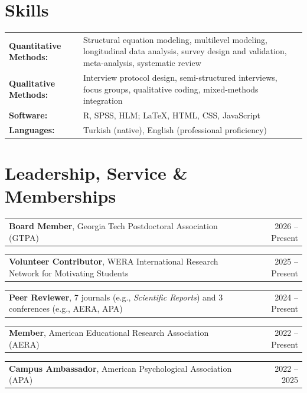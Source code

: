 \documentclass[letterpaper,11pt]{article}
\makeatletter
\newcommand{\oneline}[2]{%
  \begin{tabular*}{\linewidth}[t]{@{}l@{\extracolsep{\fill}}r@{}}
    #1 & #2 \\
  \end{tabular*}\par}
\makeatother
\begin{document}
\section{Skills}
\begin{tabular*}{\linewidth}{@{}p{0.25\linewidth}>{\raggedright\arraybackslash}p{0.75\linewidth}@{}}
  \textbf{Quantitative Methods:} & Structural equation modeling, multilevel modeling, longitudinal data analysis, survey design and validation, meta-analysis, systematic review \\[1pt]
  \textbf{Qualitative Methods:}  & Interview protocol design, semi-structured interviews, focus groups, qualitative coding, mixed-methods integration \\[1pt]
  \textbf{Software:}             & R, SPSS, HLM; \LaTeX, HTML, CSS, JavaScript \\[1pt]
  \textbf{Languages:}            & Turkish (native), English (professional proficiency) \\
\end{tabular*}

\section{Leadership, Service \& Memberships}
\oneline{\textbf{Board Member}, Georgia Tech Postdoctoral Association (GTPA)}{2026 -- Present}
\oneline{\textbf{Volunteer Contributor}, WERA International Research Network for Motivating Students}{2025 -- Present}
\oneline{\textbf{Peer Reviewer}, 7 journals (e.g., \textit{Scientific Reports}) and 3 conferences (e.g., AERA, APA)}{2024 -- Present}
\oneline{\textbf{Member}, American Educational Research Association (AERA)}{2022 -- Present}
\oneline{\textbf{Campus Ambassador}, American Psychological Association (APA)}{2022 -- 2025}

\end{document}
